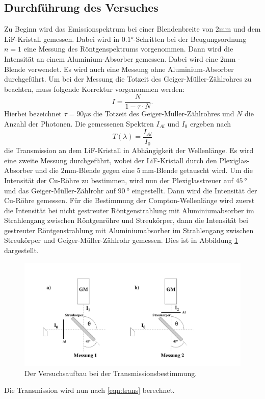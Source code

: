 \subsection{Durchführung des Versuches}
Zu Beginn wird das Emissionspektrum bei einer Blendenbreite von $2 \si{\milli\meter}$ und dem LiF-Kristall gemessen. Dabei wird in $0.1 \si{\degree}$-Schritten bei der Beugungsordnung $n = 1$ eine Messung des
Röntgenspektrums vorgenommen. Dann wird die Intensität an einem Aluminium-Absorber gemessen. Dabei wird eine $2 \si{\milli\meter}$ -Blende verwendet. Es wird auch eine Messung ohne Aluminium-Absorber
durchgeführt.
Um bei der Messung die Totzeit des Geiger-Müller-Zählrohres zu beachten, muss folgende Korrektur vorgenommen werden:
\begin{equation}
	I = \frac{N}{1 - \tau \cdot N}.
  \label{eqn:(4)}
\end{equation}
Hierbei bezeichnet $\tau = 90 \mu \si{\second}$ die Totzeit des Geiger-Müller-Zählrohres und $N$ die Anzahl der Photonen.
Die gemessenen Spektren $I_{Al}$ und $I_0$ ergeben nach
\begin{equation}
	T(\lambda) = \frac{I_{Al}}{I_0}
	\label{eqn:trans}
\end{equation}
die Transmission an dem LiF-Kristall in Abhängigkeit der Wellenlänge.
Es wird eine zweite Messung durchgeführt, wobei der LiF-Kristall durch den Plexiglas-Absorber und die $2 \si{\milli\meter}$-Blende gegen eine $\SI{5}{\milli\meter}$-Blende getauscht wird.
Um die Intensität der Cu-Röhre zu bestimmen, wird nun der Plexiglasstreuer auf $\SI{45}{\degree}$ und das Geiger-Müller-Zählrohr auf $\SI{90}{\degree}$ eingestellt. Dann wird die Intensität der Cu-Röhre gemessen.
Für die Bestimmung der Compton-Wellenlänge wird zuerst die Intensität bei nicht gestreuter Röntgenstrahlung mit Aluminiumabsorber im Strahlengang zwischen Röntgenröhre und Streukörper,
dann die Intensität bei gestreuter Röntgenstrahlung mit Aluminiumabsorber im Strahlengang zwischen Streukörper und Geiger-Müller-Zählrohr gemessen.
Dies ist in Abbildung \ref{fig:versuchsaufbau2} dargestellt.

\begin{figure}[H]
  \centering
  \includegraphics[scale=0.3]{content/versuchsaufbau2.png}
  \caption{Der Versuchsaufbau bei der Transmissionsbestimmung. \cite{AP01}}
  \label{fig:versuchsaufbau2}
\end{figure}
Die Transmission wird nun nach \eqref{eqn:trans} berechnet.
